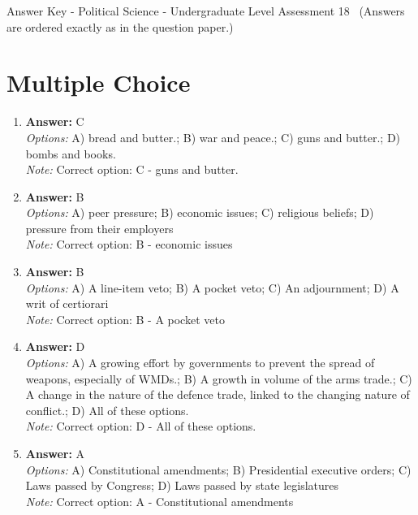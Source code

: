 \documentclass[12pt]{article}
\begin{document}
\begin{center}
Answer Key - Political Science - Undergraduate Level Assessment 18 \
\small (Answers are ordered exactly as in the question paper.)
\end{center}

\section*{Multiple Choice}
\begin{enumerate}[label=\arabic*.]
\item \textbf{Answer:} C
\\ \textit{Options:} A) bread and butter.; B) war and peace.; C) guns and butter.; D) bombs and books.
\\ \textit{Note:} Correct option: C - guns and butter.
\item \textbf{Answer:} B
\\ \textit{Options:} A) peer pressure; B) economic issues; C) religious beliefs; D) pressure from their employers
\\ \textit{Note:} Correct option: B - economic issues
\item \textbf{Answer:} B
\\ \textit{Options:} A) A line-item veto; B) A pocket veto; C) An adjournment; D) A writ of certiorari
\\ \textit{Note:} Correct option: B - A pocket veto
\item \textbf{Answer:} D
\\ \textit{Options:} A) A growing effort by governments to prevent the spread of weapons, especially of WMDs.; B) A growth in volume of the arms trade.; C) A change in the nature of the defence trade, linked to the changing nature of conflict.; D) All of these options.
\\ \textit{Note:} Correct option: D - All of these options.
\item \textbf{Answer:} A
\\ \textit{Options:} A) Constitutional amendments; B) Presidential executive orders; C) Laws passed by Congress; D) Laws passed by state legislatures
\\ \textit{Note:} Correct option: A - Constitutional amendments
\end{enumerate}
\end{document}
